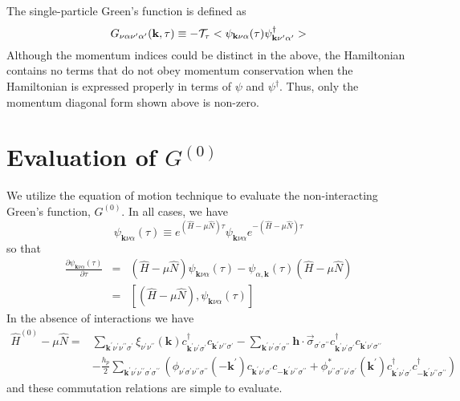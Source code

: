 The single-particle Green's function is defined as
\begin{equation}
G_{\nu\alpha\nu^{\prime}\alpha^{\prime}}(\mathbf{k},\tau) \equiv
- \cal{T}_{\tau} <\psi_{\mathbf{k}\nu\alpha}(\tau) 
\psi^{\dagger}_{\mathbf{k}\nu^{\prime}\alpha^{\prime}}>
\end{equation}
Although the momentum indices could be distinct in the
above, the Hamiltonian contains no terms that do not
obey momentum conservation when the Hamiltonian is
expressed properly in terms of $\psi$ and $\psi^{\dagger}$.
Thus, only the momentum diagonal form shown above is
non-zero.

\section{Evaluation of $G^{(0)}$}

We utilize the equation of motion technique to evaluate
the non-interacting Green's function, $G^{(0)}$.
In all cases, we have
\begin{equation}
\psi_{\mathbf{k}\nu\alpha}(\tau) \equiv
e^{(\hat{H}-\mu\hat{N})\tau} \psi_{\mathbf{k}\nu\alpha}
e^{-(\hat{H}-\mu\hat{N})\tau} 
\end{equation}
so that
\begin{eqnarray}
\frac{\partial \psi_{\mathbf{k}\nu\alpha}(\tau)}{\partial \tau} & = &
(\hat{H} - \mu \hat{N}) \psi_{\mathbf{k}\nu\alpha}(\tau) -
 \psi_{\alpha,\mathbf{k}}(\tau)(\hat{H} - \mu \hat{N}) \\
& = & \left[ (\hat{H} - \mu\hat{N}),\psi_{\mathbf{k}\nu\alpha}(\tau) \right]
\end{eqnarray}
In the absence of interactions we have
\begin{equation}
\begin{split}
\hat{H}^{(0)} - \mu \hat{N} = & \sum_{\mathbf{k}^{\prime}\nu^{\prime}\nu^{\prime\prime}\sigma^{\prime}}
 \xi_{\nu^{\prime}\nu^{\prime\prime}}(\mathbf{k}) 
c^{\dagger}_{\mathbf{k}^{\prime}\nu^{\prime}\sigma^{\prime}}
c_{\mathbf{k}^{\prime}\nu^{\prime\prime}\sigma^{\prime}} -
\sum_{\mathbf{k}^{\prime}\nu^{\prime}\sigma^{\prime}\sigma^{\prime\prime}}
\mathbf{h}\cdot\vec{\sigma}_{\sigma^{\prime}\sigma^{\prime\prime}}
c^{\dagger}_{\mathbf{k}^{\prime}\nu^{\prime}\sigma^{\prime}}
c_{\mathbf{k}^{\prime}\nu^{\prime}\sigma^{\prime\prime}} \\
& - \frac{h_p}{2}
\sum_{\mathbf{k}^{\prime}\nu^{\prime}\nu^{\prime\prime}\sigma^{\prime}\sigma^{\prime\prime}}
\left(\phi_{\nu^{\prime}\sigma^{\prime}\nu^{\prime\prime}\sigma^{\prime\prime}}(-\mathbf{k}^{\prime})
c_{\mathbf{k}^{\prime}\nu^{\prime}\sigma^{\prime}}
c_{-\mathbf{k}^{\prime}\nu^{\prime\prime}\sigma^{\prime\prime}}
+
\phi^*_{\nu^{\prime\prime}\sigma^{\prime\prime}\nu^{\prime}\sigma^{\prime}}(\mathbf{k}^{\prime})
c^{\dagger}_{\mathbf{k}^{\prime}\nu^{\prime}\sigma^{\prime}}
c^{\dagger}_{-\mathbf{k}^{\prime}\nu^{\prime\prime}\sigma^{\prime\prime}}\right)
\end{split}
\end{equation}
and these commutation relations are simple to evaluate.

